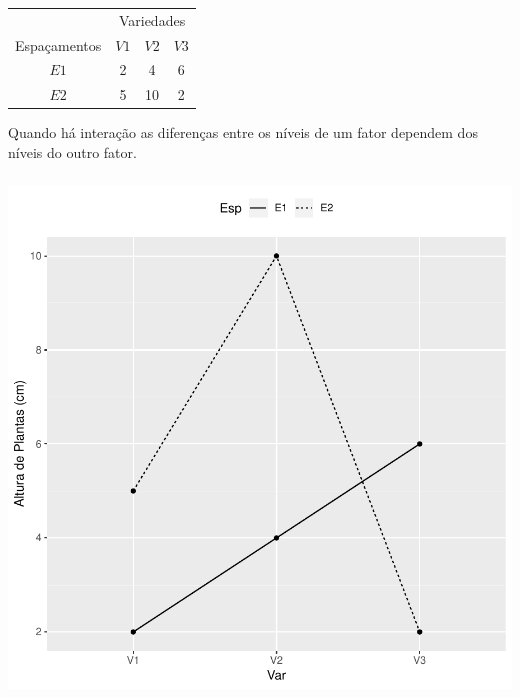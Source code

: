 \documentclass[14pt,aspectratio=1610]{beamer}
\begin{document}
\begin{frame}{}
\frametitle{}
\begin{block}{}
\justifying
\begin{table}[!h]
\begin{tabular}{cccc}
\hline
&\multicolumn{3}{c}{Variedades}\\
\cline{2-4}
Espaçamentos&$V1$&$V2$&$V3$\\
\hline
$E1$&2&4&6\\
$E2$&5&10&2\\
\hline
\end{tabular}
\end{table}
Quando há interação as diferenças entre os níveis de um fator dependem dos níveis do outro fator.
\end{block}
\end{frame}

\begin{frame}{}
\frametitle{}
\begin{block}{}
\begin{center}
\includegraphics{Aula15-002}
\end{center}
\end{block}
\end{frame}
\end{document}
